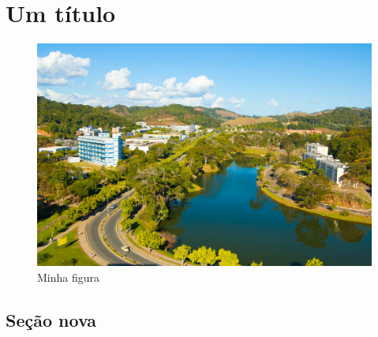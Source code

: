 \documentclass[12pt]{report}
\begin{document}
\clearpage
\linenumbers %
\modulolinenumbers[3] %


\chapter{Um título}
\lipsum[2-2] \citep{lamport1986latex} 
\begin{figure}[h]
\centering
\caption{Minha figura}
\includegraphics[scale=0.7]{./capitulos/cap01/ufv.jpg}
\end{figure}
\section{Seção nova}
\lipsum[2-3]









\end{document}
